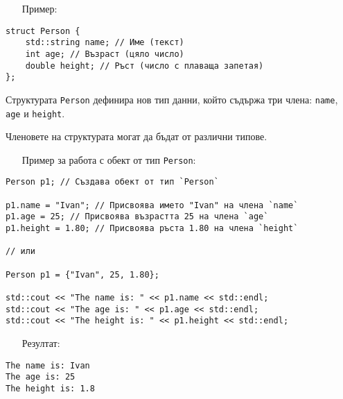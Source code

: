 \documentclass[oneside]{book}
\newcommand*{\code}[1]{\texttt{#1}}
\begin{document}
\begin{itemize}\item[Пример:]\end{itemize}
\begin{mdframed}\begin{lstlisting}
struct Person {
    std::string name; // Име (текст)
    int age; // Възраст (цяло число)
    double height; // Ръст (число с плаваща запетая)
};
\end{lstlisting}\end{mdframed}

Структурата \code{Person} дефинира нов тип данни, който съдържа три члена: \code{name}, \code{age} и \code{height}.

Членовете на структурата могат да бъдат от различни типове.
\pagebreak
\begin{itemize}\item[Пример] за работа с обект от тип \code{Person}:\end{itemize}\vspace{-12pt}
\begin{mdframed}\begin{lstlisting}
Person p1; // Създава обект от тип `Person`

p1.name = "Ivan"; // Присвоява името "Ivan" на члена `name`
p1.age = 25; // Присвоява възрастта 25 на члена `age`
p1.height = 1.80; // Присвоява ръста 1.80 на члена `height`

// или

Person p1 = {"Ivan", 25, 1.80};

std::cout << "The name is: " << p1.name << std::endl;
std::cout << "The age is: " << p1.age << std::endl;
std::cout << "The height is: " << p1.height << std::endl;
\end{lstlisting}\end{mdframed}

\begin{itemize}\item[Резултат:]\end{itemize}\vspace{-12pt}
\begin{mdframed}\begin{lstlisting}[language={}]
The name is: Ivan
The age is: 25
The height is: 1.8
\end{lstlisting}\end{mdframed}
\end{document}

